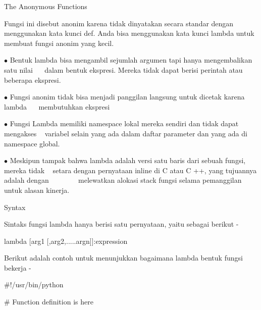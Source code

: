 \noindent 
The $  $Anonymous $  $Functions \par
\noindent 
Fungsi ini disebut anonim karena tidak dinyatakan secara standar dengan menggunakan kata kunci def. Anda bisa menggunakan kata kunci lambda untuk membuat fungsi anonim yang kecil. \par
\noindent 
 \hspace*{0.5in}  $ \bullet $ Bentuk lambda bisa mengambil sejumlah argumen tapi hanya mengembalikan satu nilai  \hspace*{0.5in} ~~ dalam bentuk ekspresi. Mereka tidak dapat berisi perintah atau beberapa ekspresi. \par
\noindent 
 \hspace*{0.5in}  $ \bullet $ Fungsi anonim tidak bisa menjadi panggilan langsung untuk dicetak karena lambda  \hspace*{0.5in} ~~ membutuhkan ekspresi \par
\noindent 
 \hspace*{0.5in}  $ \bullet $ Fungsi Lambda memiliki namespace lokal mereka sendiri dan tidak dapat mengakses  \hspace*{0.5in} ~ variabel selain yang ada dalam daftar parameter dan yang ada di namespace global. \par
\noindent 
 \hspace*{0.5in}  $ \bullet $ Meskipun tampak bahwa lambda adalah versi satu baris dari sebuah fungsi, mereka tidak  \hspace*{0.5in} ~ setara dengan pernyataan inline di C atau C ++, yang tujuannya adalah dengan  \hspace*{0.5in} ~~~~~~~ melewatkan alokasi stack fungsi selama pemanggilan untuk alasan kinerja. \par
\vspace{12pt}
\noindent 
Syntax \par
\noindent 
Sintaks fungsi lambda hanya berisi satu pernyataan, yaitu sebagai berikut - \par
\noindent 
 \hspace*{0.5in} lambda [arg1 [,arg2,.....argn]]:expression \par
\noindent 
Berikut adalah contoh untuk menunjukkan bagaimana lambda bentuk fungsi bekerja - \par
\noindent 
 \hspace*{0.5in}  $  \#  $!/usr/bin/python \par
\vspace{12pt}
\noindent 
 \hspace*{0.5in}  $  \#  $ Function definition is here \par
